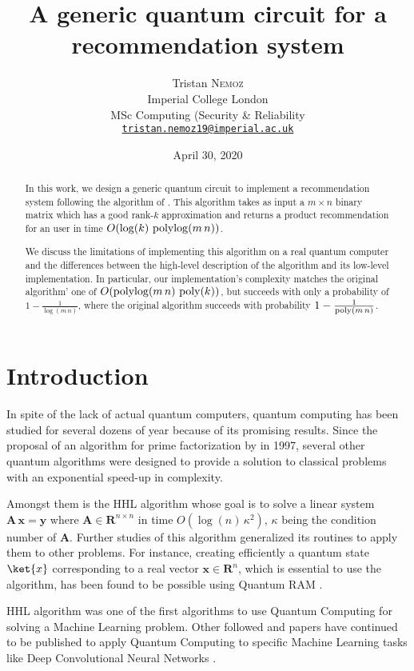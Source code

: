\documentclass[11pt, a4paper]{article}
\date{April 30, 2020}
\author{Tristan \textsc{Nemoz}\\Imperial College London\\MSc Computing (Security \& Reliability\\\href{mailto:tristan.nemoz19@imperial.ac.uk}{\texttt{tristan.nemoz19@imperial.ac.uk}}}
\title{A generic quantum circuit for a recommendation system}
\begin{document}
	
	\maketitle
    \begin{abstract}
        In this work, we design a generic quantum circuit to implement a recommendation system following the algorithm of \citeauthor{QRS}. This algorithm takes as input a \(m\times n\) binary matrix which has a good rank-\(k\) approximation and returns a product recommendation for an user in time \(O(\log(k)\,\operatorname{polylog}(m\,n))\).
        
        We discuss the limitations of implementing this algorithm on a real quantum computer and the differences between the high-level description of the algorithm and its low-level implementation. In particular, our implementation's complexity matches the original algorithm' one of \(O(\operatorname{polylog}(m\,n)\,\operatorname{poly}(k))\), but succeeds with only a probability of \(1-\frac{1}{\log(m\,n)}\), where the original algorithm succeeds with probability \(1 - \frac{1}{\operatorname{poly}(m\,n)}\).
    \end{abstract}
    
    \section{Introduction}
        In spite of the lack of actual quantum computers, quantum computing has been studied for several dozens of year because of its promising results. Since the proposal of an algorithm for prime factorization \cite{Shor} by \citeauthor{Shor} in 1997, several other quantum algorithms were designed to provide a solution to classical problems with an exponential speed-up in complexity.
        
        Amongst them is the HHL algorithm \cite{HHL} whose goal is to solve a linear system \(\mathbf{A}\,\mathbf{x}=\mathbf{y}\) where \(\mathbf{A}\in\mathbf{R}^{n\times n}\) in time \(O\left(\log(n)\,\kappa^2\right)\), \(\kappa\) being the condition number of \(\mathbf{A}\). Further studies of this algorithm generalized its routines to apply them to other problems. For instance, creating efficiently a quantum state \(\ket{x}\) corresponding to a real vector \(\mathbf{x}\in\mathbf{R}^n\), which is essential to use the algorithm, has been found to be possible using Quantum RAM \cite{Prakash, QRAM, QRAMCircuit}.
        
        HHL algorithm was one of the first algorithms to use Quantum Computing for solving a Machine Learning problem. Other followed and papers have continued to be published to apply Quantum Computing to specific Machine Learning tasks like Deep Convolutional Neural Networks \cite{QCNN}.
        
\end{document}
